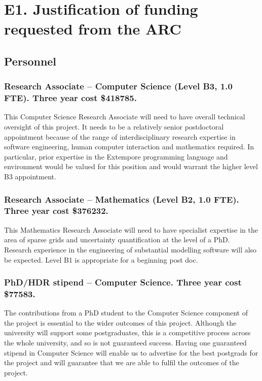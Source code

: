 \documentclass[a4paper,twoside,12pt,compact]{article}
\author{}
\date{\today}
\begin{document}
\section*{E1. Justification of funding requested from the ARC}
\label{sec:justificatoin}

\subsection*{Personnel}


\subsubsection*{Research Associate – Computer Science (Level B3, 1.0 FTE). Three year cost \$418785.}

This Computer Science Research Associate will need to have overall technical oversight of this project. It needs to be a relatively senior postdoctoral appointment because of the range of interdisciplinary research expertise in software engineering, human computer interaction and mathematics required. In particular, prior expertise in the Extempore programming language and environment would be valued for this position and would warrant the higher level B3 appointment.


\subsubsection*{Research Associate – Mathematics (Level B2, 1.0 FTE).  Three year cost \$376232.}

This Mathematics Research Associate will need to have specialist expertise in the area of sparse grids and uncertainty quantification at the level of a PhD.  Research experience in the engineering of substantial modelling software will also be expected. Level B1 is appropriate for a beginning post doc. 

\subsubsection*{PhD/HDR stipend – Computer Science.  Three year cost \$77583.}

The contributions from a PhD student to the Computer Science component of the project is essential to the wider outcomes of this project.
Although the university will support some postgraduates, this is a competitive
process across the whole university, and so is not guaranteed success. Having one guaranteed stipend in Computer Science will enable us to advertise for the best postgrads for the project and will guarantee that we are able to fulfil the outcomes of the project. 
\end{document}
